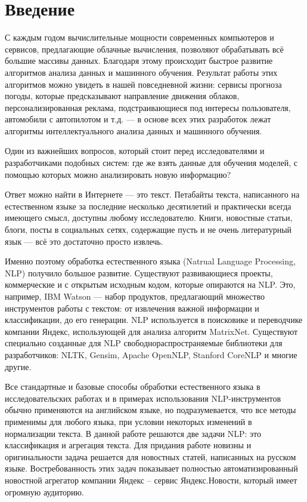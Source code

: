 \documentclass[a4paper, 14pt]{extarticle}
\begin{document}

\section{Введение}
С каждым годом вычислительные мощности современных компьютеров и сервисов, предлагающие облачные вычисления, позволяют 
обрабатывать всё большие массивы данных. Благодаря этому происходит быстрое развитие алгоритмов анализа данных и машинного обучения. Результат работы этих алгоритмов можно увидеть в нашей повседневной жизни: 
сервисы прогноза погоды, которые предсказывают направление движения облаков, персонализированная реклама, подстраивающиеся под 
интересы пользователя, автомобили с автопилотом и т.д. --- в основе всех этих разработок лежат алгоритмы интеллектуального анализа данных и машинного обучения.

Один из важнейших вопросов, который стоит перед исследователями и разработчиками подобных систем: где же взять данные для обучения моделей, с помощью которых можно анализировать новую информацию?

Ответ можно найти в Интернете --- это текст. Петабайты текста, написанного на естественном языке за последние несколько 
десятилетий и практически всегда имеющего смысл, доступны любому исследователю. Книги, новостные статьи, блоги, посты в 
социальных сетях, содержащие пусть и не очень литературный язык --- всё это достаточно просто извлечь.

Именно поэтому обработка естественного языка (Natrual Language Processing, NLP) получило большое развитие. Существуют развивающиеся проекты, коммерческие и с открытым исходным кодом, которые опираются на NLP. Это, например, IBM 
Watson --- набор продуктов, предлагающий множество инструментов работы с текстом: от извлечения важной информации и 
классификации, до его генерации. %
NLP используется в поисковике и переводчике компании Яндекс, использующей для анализа алгоритм MatrixNet. %
Существуют специально созданные для NLP свободнораспространяемые библиотеки для разработчиков: NLTK, Gensim, Apache 
OpenNLP, Stanford CoreNLP и многие другие.

Все стандартные и базовые способы обработки естественного языка в исследовательских работах и в примерах использования 
NLP-инструментов обычно применяются на английском языке, но подразумевается, что все методы применимы для любого 
языка, при условии некоторых изменений в нормализации текста.
В данной работе решаются две задачи NLP: это классификация и агрегация текста. Для придания работе новизны и 
оригинальности задача решается для новостных статей, написанных на русском языке. Востребованность этих задач 
показывает полностью автоматизированный новостной агрегатор компании Яндекс -- сервис Яндекс.Новости, который имеет 
огромную аудиторию. %
\end{document}
